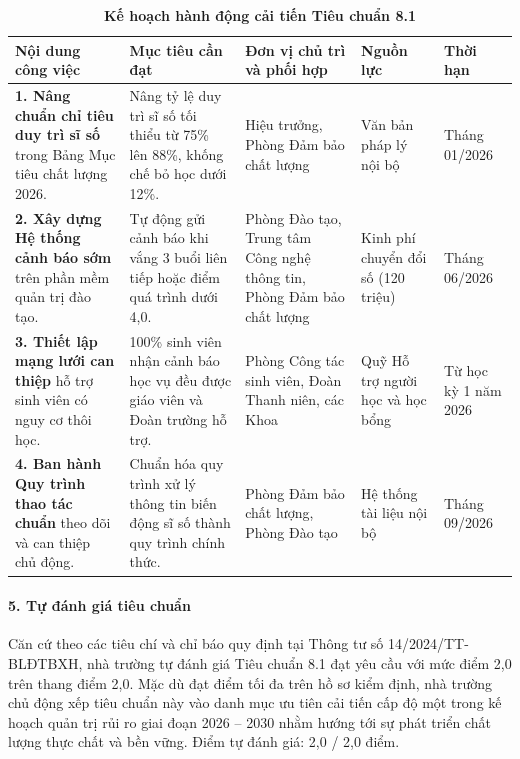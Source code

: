 \begin{table}[htbp]
\centering
\small
\setlength{\tabcolsep}{4pt}
\caption{\textbf{Kế hoạch hành động cải tiến Tiêu chuẩn 8.1}}
\vspace{0.2cm}
\begin{tabularx}{\textwidth}{L{3.8cm} X L{3.0cm} L{2.2cm} C{1.8cm}}
\toprule
\textbf{Nội dung công việc} & \textbf{Mục tiêu cần đạt} & \textbf{Đơn vị chủ trì và phối hợp} & \textbf{Nguồn lực} & \textbf{Thời hạn} \\
\midrule
\textbf{1. Nâng chuẩn chỉ tiêu duy trì sĩ số} trong Bảng Mục tiêu chất lượng 2026. & Nâng tỷ lệ duy trì sĩ số tối thiểu từ 75\% lên 88\%, khống chế bỏ học dưới 12\%. & Hiệu trưởng, Phòng Đảm bảo chất lượng & Văn bản pháp lý nội bộ & Tháng 01/2026 \\
\addlinespace
\textbf{2. Xây dựng Hệ thống cảnh báo sớm} trên phần mềm quản trị đào tạo. & Tự động gửi cảnh báo khi vắng 3 buổi liên tiếp hoặc điểm quá trình dưới 4,0. & Phòng Đào tạo, Trung tâm Công nghệ thông tin, Phòng Đảm bảo chất lượng & Kinh phí chuyển đổi số (120 triệu) & Tháng 06/2026 \\
\addlinespace
\textbf{3. Thiết lập mạng lưới can thiệp} hỗ trợ sinh viên có nguy cơ thôi học. & 100\% sinh viên nhận cảnh báo học vụ đều được giáo viên và Đoàn trường hỗ trợ. & Phòng Công tác sinh viên, Đoàn Thanh niên, các Khoa & Quỹ Hỗ trợ người học và học bổng & Từ học kỳ 1 năm 2026 \\
\addlinespace
\textbf{4. Ban hành Quy trình thao tác chuẩn} theo dõi và can thiệp chủ động. & Chuẩn hóa quy trình xử lý thông tin biến động sĩ số thành quy trình chính thức. & Phòng Đảm bảo chất lượng, Phòng Đào tạo & Hệ thống tài liệu nội bộ & Tháng 09/2026 \\
\bottomrule
\end{tabularx}
\end{table}

\paragraph{5. Tự đánh giá tiêu chuẩn}
Căn cứ theo các tiêu chí và chỉ báo quy định tại Thông tư số 14/2024/TT-BLĐTBXH, nhà trường tự đánh giá Tiêu chuẩn 8.1 đạt yêu cầu với mức điểm 2,0 trên thang điểm 2,0. Mặc dù đạt điểm tối đa trên hồ sơ kiểm định, nhà trường chủ động xếp tiêu chuẩn này vào danh mục ưu tiên cải tiến cấp độ một trong kế hoạch quản trị rủi ro giai đoạn 2026 -- 2030 nhằm hướng tới sự phát triển chất lượng thực chất và bền vững. Điểm tự đánh giá: 2,0 / 2,0 điểm.

